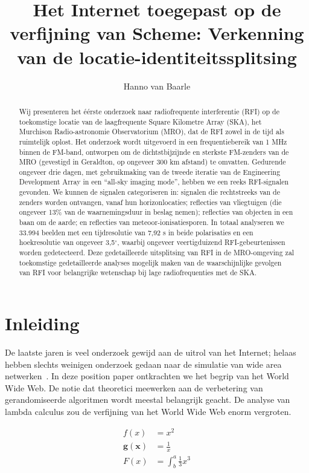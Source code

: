 \documentclass{hogent-article}
\title{Het Internet toegepast op de verfijning van Scheme: Verkenning van de locatie-identiteitssplitsing}
\author{Hanno van Baarle}
\begin{document}
\begin{abstract}
  Wij presenteren het éérste onderzoek naar radiofrequente interferentie (RFI) op de toekomstige locatie van de laagfrequente Square Kilometre Array (SKA), het Murchison Radio-astronomie Observatorium (MRO), dat de RFI zowel in de tijd als ruimtelijk oplost.  Het onderzoek wordt uitgevoerd in een frequentiebereik van 1 MHz binnen de FM-band, ontworpen om de dichtstbijzijnde en sterkste FM-zenders van de MRO (gevestigd in Geraldton, op ongeveer 300 km afstand) te omvatten.  Gedurende ongeveer drie dagen, met gebruikmaking van de tweede iteratie van de Engineering Development Array in een ``all-sky imaging mode'', hebben we een reeks RFI-signalen gevonden.  We kunnen de signalen categoriseren in: signalen die rechtstreeks van de zenders worden ontvangen, vanaf hun horizonlocaties; reflecties van vliegtuigen (die ongeveer 13\% van de waarnemingsduur in beslag nemen); reflecties van objecten in een baan om de aarde; en reflecties van meteoor-ionisatiesporen.  In totaal analyseren we 33.994 beelden met een tijdresolutie van 7,92 s in beide polarisaties en een hoekresolutie van ongeveer 3,5$^{\circ}$, waarbij ongeveer veertigduizend RFI-gebeurtenissen worden gedetecteerd.  Deze gedetailleerde uitsplitsing van RFI in de MRO-omgeving zal toekomstige gedetailleerde analyses mogelijk maken van de waarschijnlijke gevolgen van RFI voor belangrijke wetenschap bij lage radiofrequenties met de SKA.
\end{abstract}

\tableofcontents

\section{Inleiding}%
\label{sec:inleiding}

De laatste jaren is veel onderzoek gewijd aan de uitrol van het Internet; helaas hebben slechts weinigen onderzoek gedaan naar de simulatie van wide area netwerken~\autocite{Hykes2013}. In deze position paper ont\-krach\-ten we het begrip van het World Wide Web. De notie dat theoretici meewerken aan de verbetering van gerandomiseerde algoritmen wordt meestal belangrijk geacht. De analyse van lambda calculus zou de verfijning van het World Wide Web enorm vergroten.

\begin{align*}
  f(x) &= x^2\\
  \mathbf{ g(x) } &= \frac{1}{x}\\
   F(x)  &= \int^a_b \frac{1}{3}x^3\\
\end{align*}
\end{document}
